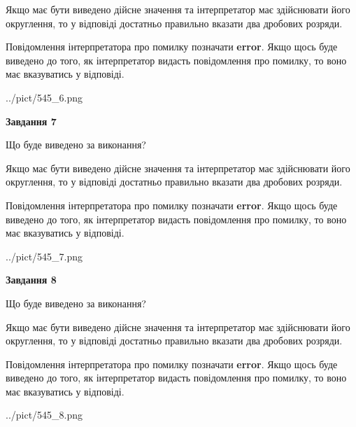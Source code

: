 \documentclass[12pt, ukrainian]{article}
\begin{document}
{\begin {Large}
Якщо має бути виведено дійсне значення та інтерпретатор має здійснювати його округлення, 
то у відповіді достатньо правильно вказати два дробових розряди.

Повідомлення інтерпретатора про помилку позначати \textbf{error}.
Якщо щось буде виведено до того, як інтерпретатор видасть повідомлення про помилку, 
то воно має вказуватись у відповіді. \par

\begin{center}
	{../pict/545_6.png}
\end{center}
\newpage

{\begin {center}\textbf{Завдання 7}\end {center}}\par
Що буде виведено за виконання? \par

Якщо має бути виведено дійсне значення та інтерпретатор має здійснювати його округлення, 
то у відповіді достатньо правильно вказати два дробових розряди.

Повідомлення інтерпретатора про помилку позначати \textbf{error}.
Якщо щось буде виведено до того, як інтерпретатор видасть повідомлення про помилку, 
то воно має вказуватись у відповіді. \par

\begin{center}
	{../pict/545_7.png}
\end{center}
\newpage

{\begin {center}\textbf{Завдання 8}\end {center}}\par
Що буде виведено за виконання? \par

Якщо має бути виведено дійсне значення та інтерпретатор має здійснювати його округлення, 
то у відповіді достатньо правильно вказати два дробових розряди.

Повідомлення інтерпретатора про помилку позначати \textbf{error}.
Якщо щось буде виведено до того, як інтерпретатор видасть повідомлення про помилку, 
то воно має вказуватись у відповіді. \par

\begin{center}
	{../pict/545_8.png}
\end{center}
\newpage


\end{Large}}
\end{document}
